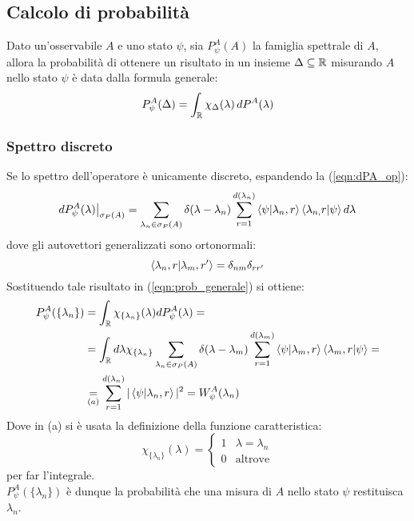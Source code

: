 \documentclass[../../FisicaTeorica.tex]{subfiles}
\begin{document}
\subsection{Calcolo di probabilità}
Dato un'osservabile $A$ e uno stato $\psi$, sia $P^A_\psi(A)$ la famiglia spettrale di $A$, allora la probabilità di ottenere un risultato in un insieme $\Delta\subseteq \mathbb{R}$ misurando $A$ nello stato $\psi$ è data dalla formula generale:
\begin{equation}
P^A_\psi(\Delta) = \int_{\mathbb{R}} \chi_\Delta(\lambda)\,dP^A(\lambda)
\label{eqn:prob_generale}
\end{equation}
\subsubsection{Spettro discreto}
Se lo spettro dell'operatore è unicamente discreto, espandendo la (\ref{eqn:dPA_op}):
\[
dP^A_\psi(\lambda)\big|_{\sigma_P(A)}=\sum_{\lambda_n\in\sigma_P(A)}\delta(\lambda-\lambda_n)\sum_{r=1}^{d(\lambda_n)}\braket{\psi|\lambda_{n},r}\braket{\lambda_{n,}r|\psi}d\lambda
\]
dove gli autovettori generalizzati sono ortonormali:
\[
\braket{\lambda_{n},r|\lambda_{m},r'}=\delta_{nm}\delta_{rr'}
\]
Sostituendo tale risultato in (\ref{eqn:prob_generale}) si ottiene:
\begin{align}
P_\psi^A(\{\lambda_n\})&=\int_{\mathbb{R}} \chi_{\{\lambda_n\}}(\lambda)dP_\psi^A(\lambda)=\nonumber \\
&=
\int_{\mathbb{R}} d\lambda \chi_{\{\lambda_n\}}\sum_{\lambda_n\in\sigma_P(A)}\delta(\lambda-\lambda_m)\sum_{r=1}^{d(\lambda_m)}\braket{\psi|\lambda_{m},r}\braket{\lambda_{m},r|\psi} =\nonumber \\
&\underset{(a)}{=} \sum_{r=1}^{d(\lambda_n)}|\braket{\psi|\lambda_{n},r}|^2 = W^A_\psi(\lambda_n)
\label{eqn:probability_discreta}
\end{align}
Dove in (a) si è usata la definizione della funzione caratteristica:
\[
\chi_{\{\lambda_n\}}(\lambda)=
\begin{cases}
1 & \lambda=\lambda_n\\
0 & \text{altrove}
\end{cases}
\]
per far  l'integrale.\\
$P_\psi^A(\{\lambda_n\})$ è dunque la probabilità che una misura di $A$ nello stato $\psi$ restituisca $\lambda_n$.\\
\end{document}
